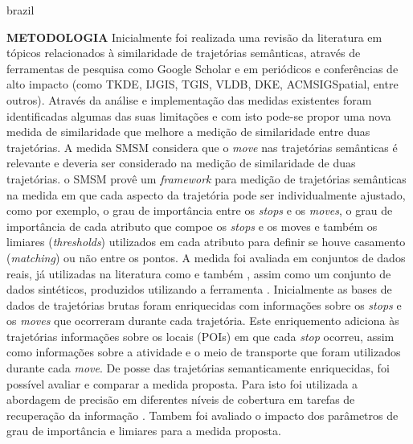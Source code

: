 {\begin{otherlanguage*}{brazil}
\begin{resumo}
        \textbf{METODOLOGIA}
        \newline
        \newline
        Inicialmente foi realizada uma revisão da literatura em tópicos relacionados à similaridade de trajetórias semânticas, através de ferramentas de pesquisa como Google Scholar e em periódicos e conferências de alto impacto (como TKDE, IJGIS, TGIS, VLDB, DKE, ACMSIGSpatial, entre outros). Através da análise e implementação das medidas existentes foram identificadas algumas das suas limitações e com isto pode-se propor uma nova medida de similaridade que melhore a medição de similaridade entre duas trajetórias.
        \newline
        A medida SMSM considera que o \emph{move} nas trajetórias semânticas é relevante e deveria ser considerado na medição de similaridade de duas trajetórias. o SMSM provê um \emph{framework} para medição de trajetórias semânticas na medida em que cada aspecto da trajetória pode ser individualmente ajustado, como por exemplo, o grau de importância entre os \emph{stops} e os \emph{moves}, o grau de importância de cada atributo que compoe os \emph{stops} e os moves e também os limiares (\emph{thresholds}) utilizados em cada atributo para definir se houve casamento (\emph{matching}) ou não entre os pontos.
        \newline
        A medida foi avaliada em conjuntos de dados reais, já utilizadas na literatura como \cite{epfl-mobility-20090224} e também \cite{zheng2009mining}, assim como um conjunto de dados sintéticos, produzidos utilizando a ferramenta \cite{Pelekis-Hermoupolis}. 
        Inicialmente as bases de dados de trajetórias brutas foram enriquecidas com informações sobre os \emph{stops} e os \emph{moves} que ocorreram durante cada trajetória. Este enriquemento adiciona às trajetórias informações sobre os locais (POIs) em que cada \emph{stop} ocorreu, assim como informações sobre a atividade e o meio de transporte que foram utilizados durante cada \emph{move}.
        De posse das trajetórias semanticamente enriquecidas, foi possível avaliar e comparar a medida proposta. Para isto foi utilizada a abordagem de precisão em diferentes níveis de cobertura em tarefas de recuperação da informação \cite{BaezaYatesRibeiroNeto2011}. Tambem foi avaliado o impacto dos parâmetros de grau de importância e limiares para a medida proposta.
        \newline
        \newline
        

\end{resumo}
\end{otherlanguage*}}
